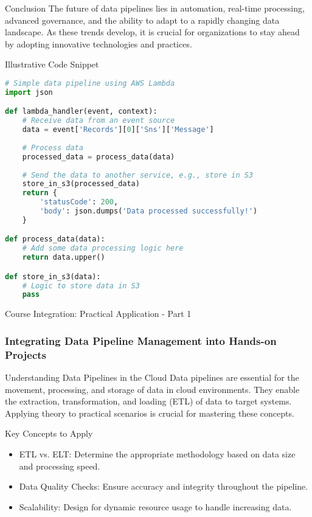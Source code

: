 \documentclass[aspectratio=169]{beamer}
\begin{document}
\begin{frame}[fragile]{Conclusion}
    The future of data pipelines lies in automation, real-time processing, advanced governance, and the ability to adapt to a rapidly changing data landscape. As these trends develop, it is crucial for organizations to stay ahead by adopting innovative technologies and practices.
\end{frame}

\begin{frame}[fragile]{Illustrative Code Snippet}
    \begin{lstlisting}[language=Python]
# Simple data pipeline using AWS Lambda
import json

def lambda_handler(event, context):
    # Receive data from an event source
    data = event['Records'][0]['Sns']['Message']
    
    # Process data
    processed_data = process_data(data)
    
    # Send the data to another service, e.g., store in S3
    store_in_s3(processed_data)
    return {
        'statusCode': 200,
        'body': json.dumps('Data processed successfully!')
    }

def process_data(data):
    # Add some data processing logic here
    return data.upper()

def store_in_s3(data):
    # Logic to store data in S3
    pass
    \end{lstlisting}
\end{frame}

\begin{frame}[fragile]{Course Integration: Practical Application - Part 1}
    \frametitle{Integrating Data Pipeline Management into Hands-on Projects}
    
    \begin{block}{Understanding Data Pipelines in the Cloud}
        Data pipelines are essential for the movement, processing, and storage of data in cloud environments. They enable the extraction, transformation, and loading (ETL) of data to target systems. Applying theory to practical scenarios is crucial for mastering these concepts.
    \end{block}

    \begin{block}{Key Concepts to Apply}
        \begin{itemize}
            \item ETL vs. ELT: Determine the appropriate methodology based on data size and processing speed.
            \item Data Quality Checks: Ensure accuracy and integrity throughout the pipeline.
            \item Scalability: Design for dynamic resource usage to handle increasing data.
        \end{itemize}
    \end{block}
\end{frame}
\end{document}
